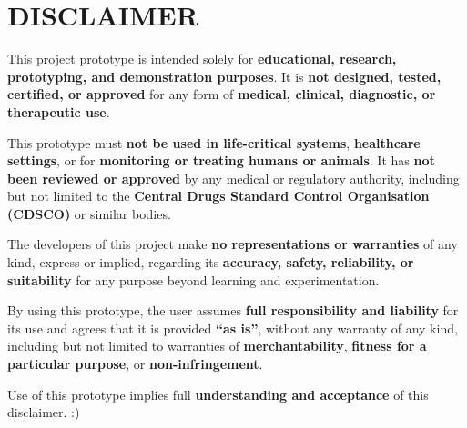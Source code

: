 \documentclass[twoside]{article}
\begin{document}
\section{DISCLAIMER}
    This project prototype is intended solely for \textbf{educational, research, prototyping, and demonstration purposes}. It is \textbf{not designed, tested, certified, or approved} for any form of \textbf{medical, clinical, diagnostic, or therapeutic use}.

    This prototype must \textbf{not be used in life-critical systems}, \textbf{healthcare settings}, or for \textbf{monitoring or treating humans or animals}. It has \textbf{not been reviewed or approved} by any medical or regulatory authority, including but not limited to the \textbf{Central Drugs Standard Control Organisation (CDSCO)} or similar bodies.

    The developers of this project make \textbf{no representations or warranties} of any kind, express or implied, regarding its \textbf{accuracy, safety, reliability, or suitability} for any purpose beyond learning and experimentation.

    By using this prototype, the user assumes \textbf{full responsibility and liability} for its use and agrees that it is provided \textbf{“as is”}, without any warranty of any kind, including but not limited to warranties of \textbf{merchantability}, \textbf{fitness for a particular purpose}, or \textbf{non-infringement}.

    Use of this prototype implies full \textbf{understanding and acceptance} of this disclaimer.
\newpage
:)
\thispagestyle{empty}
\end{document}
